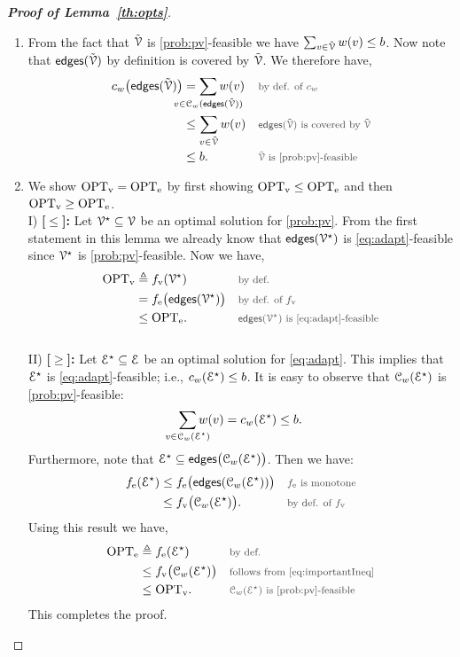 \documentclass[conference]{IEEEtran}
\begin{document}
\begin{proof}[\bfseries Proof of Lemma~\ref{th:opts}]
\begin{enumerate}
\item From the fact that $\tilde{\mathcal{V}}$ is \ref{prob:pv}-feasible we have $\sum_{v
	\in \tilde{\mathcal{V}}} w(v) \leq b$.
Now note that $\mathsf{edges}(\tilde{\mathcal{V}})$ by definition is covered by $\tilde{\mathcal{V}}$.
We therefore have,
\begin{align}
	\vcover\big(\edg(\tilde{\VV})\big) & = \sum_{\mathclap{v \in
 \Vcover(\edg(\tilde{\VV}))}} w(v) && \ptext{by def. of
	$\vcover$}\\ & \leq  \sum_{v \in
 \tilde{\VV}} w(v) && \ptext{$\edg(\tilde{\VV})$ is covered by
 $\tilde{\VV}$} \\ & \leq b.
 &&\ptext{$\tilde{\VV}$ is \ref{prob:pv}-feasible}
\end{align}

\item We show $\mathrm{OPT}_\text{v} = \mathrm{OPT}_\text{e}$ by first showing $\mathrm{OPT}_\text{v} \leq \mathrm{OPT}_\text{e}$ and then $\mathrm{OPT}_\text{v}
  \geq \mathrm{OPT}_\text{e}$.\\[0.2cm]
  I) \textbf{[$\boldsymbol{\leq}$]:} Let $\mathcal{V}^\star \subseteq \mathcal{V}$ be an
  optimal solution for \ref{prob:pv}. From the first statement in this lemma
  we already know that $\mathsf{edges}(\mathcal{V}^\star)$
  is \ref{eq:adapt}-feasible since $\mathcal{V}^\star$ is \ref{prob:pv}-feasible.
  Now we have,
  \begin{align}
	\OPTv & \triangleq \fv(\VV^\star) && \ptext{by def.} \\
	& = \fe\big(\edg(\VV^\star)\big) && \ptext{by def. of $\fv$}\\
	& \leq \OPTe. && \ptext{$\edg(\VV^\star)$ is \ref{eq:adapt}-feasible}
	\label{}
  \end{align}\\[0.2cm]
  II) \textbf{[$\boldsymbol{\geq}$]:}
  Let $\mathcal{E}^\star \subseteq {\mathcal{E}}$
  be an optimal solution for \ref{eq:adapt}. This implies that $\mathcal{E}^\star$ is \ref{eq:adapt}-feasible; i.e., $c_w(\mathcal{E}^\star) \leq
  b$.
  It is easy to observe that $\mathcal{C}_w(\mathcal{E}^\star)$
  is \ref{prob:pv}-feasible:
  \begin{align}
	\sum_{\mathclap{v \in \Vcover(\Lcal^\star)}} w(v) = \vcover(\Lcal^\star)
	\leq b.
	\label{}
  \end{align}
  Furthermore, note that $\mathcal{E}^\star \subseteq
  \mathsf{edges}\big(\mathcal{C}_w(\mathcal{E}^\star)\big)$. Then we have:
  \begin{align}
	\fe(\Lcal^\star) & \leq \fe\big(\edg(\Vcover(\Lcal^\star))\big) &&
	\ptext{$\fe$ is monotone}\\
	& \leq \fv\big(\Vcover(\Lcal^\star)\big). && \ptext{by def. of $\fv$}
	\label{eq:importantIneq}
  \end{align}
  Using this result we have,
  \begin{align}
	\OPTe & \triangleq \fe(\Lcal^\star) && \ptext{by def.}\\
	& \leq \fv\big(\Vcover(\Lcal^\star)\big) &&
	\ptext{follows from \eqref{eq:importantIneq}}\\
	& \leq \OPTv. &&
	\ptext{$\Vcover(\Lcal^\star)$ is \ref{prob:pv}-feasible}
	\label{}
  \end{align}
  This completes the proof.
\end{enumerate}
\end{proof}
\end{document}
